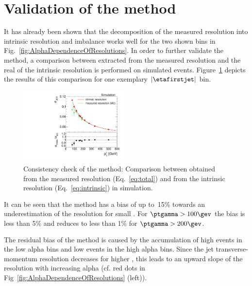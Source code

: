 \section{Validation of the method}
\label{res:sec:validation}
It has already been shown that the decomposition of the measured resolution into intrinsic resolution and imbalance works well for the two shown \ptgamma bins in Fig.~\ref{fig:AlphaDependenceOfResolutions}.
In order to further validate the method, a comparison between \jer extracted from the measured resolution and the real \jer of the intrinsic resolution is performed on simulated events. 
Figure~\ref{fig:MCClosure} depicts the results of this comparison for one exemplary $|\etafirstjet|$ bin.
\begin{figure}[!b]
  \centering
    \includegraphics[width=0.49\textwidth]{figures/resolution/methodology/MCClosure_for_1_eta_bin_RMS99.pdf}
  \caption{Consistency check of the method: Comparison between \jer obtained from the measured resolution (Eq.~\eqref{eq:total}) and from the intrinsic resolution (Eq.~\eqref{eq:intrinsic}) in simulation.}  
  \label{fig:MCClosure}
\end{figure}
It can be seen that the method has a bias of up to~15\% towards an underestimation of the resolution for small \ptgamma. 
For $\ptgamma>100\gev$ the bias is less than 5\% and reduces to less than 1\% for $\ptgamma>200\gev$.


The residual bias of the method is caused by the accumulation of high \ptfirstjet events in the low alpha bins and low \ptfirstjet events in the high alpha bins.
Since the jet transverse-momentum resolution decreases for higher \ptfirstjet, this leads to an upward slope of the resolution with increasing alpha (cf. red dots in Fig~\ref{fig:AlphaDependenceOfResolutions} (left)).

